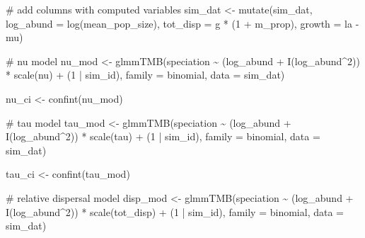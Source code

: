 \documentclass[
  letterpaper,
  DIV=11,
  numbers=noendperiod]{scrartcl}
\newenvironment{Shaded}{\begin{snugshade}}{\end{snugshade}}
\newcommand{\AttributeTok}[1]{\textcolor[rgb]{0.40,0.45,0.13}{#1}}
\newcommand{\CommentTok}[1]{\textcolor[rgb]{0.37,0.37,0.37}{#1}}
\newcommand{\DecValTok}[1]{\textcolor[rgb]{0.68,0.00,0.00}{#1}}
\newcommand{\FunctionTok}[1]{\textcolor[rgb]{0.28,0.35,0.67}{#1}}
\newcommand{\NormalTok}[1]{\textcolor[rgb]{0.00,0.23,0.31}{#1}}
\newcommand{\OtherTok}[1]{\textcolor[rgb]{0.00,0.23,0.31}{#1}}
\newcommand{\SpecialCharTok}[1]{\textcolor[rgb]{0.37,0.37,0.37}{#1}}
\begin{document}
\begin{Shaded}
\begin{Highlighting}[]
\CommentTok{\# add columns with computed variables}
\NormalTok{sim\_dat }\OtherTok{\textless{}{-}} \FunctionTok{mutate}\NormalTok{(sim\_dat, }
                  \AttributeTok{log\_abund =} \FunctionTok{log}\NormalTok{(mean\_pop\_size), }
                  \AttributeTok{tot\_disp =}\NormalTok{ g }\SpecialCharTok{*}\NormalTok{ (}\DecValTok{1} \SpecialCharTok{+}\NormalTok{ m\_prop), }
                  \AttributeTok{growth =}\NormalTok{ la }\SpecialCharTok{{-}}\NormalTok{ mu)}


\CommentTok{\# nu model}
\NormalTok{nu\_mod }\OtherTok{\textless{}{-}} \FunctionTok{glmmTMB}\NormalTok{(speciation }\SpecialCharTok{\textasciitilde{}} 
\NormalTok{                      (log\_abund }\SpecialCharTok{+} \FunctionTok{I}\NormalTok{(log\_abund}\SpecialCharTok{\^{}}\DecValTok{2}\NormalTok{)) }\SpecialCharTok{*}
                      \FunctionTok{scale}\NormalTok{(nu) }\SpecialCharTok{+}
\NormalTok{                      (}\DecValTok{1} \SpecialCharTok{|}\NormalTok{ sim\_id), }
                  \AttributeTok{family =}\NormalTok{ binomial, }\AttributeTok{data =}\NormalTok{ sim\_dat)}

\NormalTok{nu\_ci }\OtherTok{\textless{}{-}} \FunctionTok{confint}\NormalTok{(nu\_mod)}


\CommentTok{\# tau model}
\NormalTok{tau\_mod }\OtherTok{\textless{}{-}} \FunctionTok{glmmTMB}\NormalTok{(speciation }\SpecialCharTok{\textasciitilde{}} 
\NormalTok{                       (log\_abund }\SpecialCharTok{+} \FunctionTok{I}\NormalTok{(log\_abund}\SpecialCharTok{\^{}}\DecValTok{2}\NormalTok{)) }\SpecialCharTok{*}
                       \FunctionTok{scale}\NormalTok{(tau) }\SpecialCharTok{+}
\NormalTok{                       (}\DecValTok{1} \SpecialCharTok{|}\NormalTok{ sim\_id), }
                   \AttributeTok{family =}\NormalTok{ binomial, }\AttributeTok{data =}\NormalTok{ sim\_dat)}

\NormalTok{tau\_ci }\OtherTok{\textless{}{-}} \FunctionTok{confint}\NormalTok{(tau\_mod)}

\CommentTok{\# relative dispersal model}
\NormalTok{disp\_mod }\OtherTok{\textless{}{-}} \FunctionTok{glmmTMB}\NormalTok{(speciation }\SpecialCharTok{\textasciitilde{}} 
\NormalTok{                        (log\_abund }\SpecialCharTok{+} \FunctionTok{I}\NormalTok{(log\_abund}\SpecialCharTok{\^{}}\DecValTok{2}\NormalTok{)) }\SpecialCharTok{*}
                        \FunctionTok{scale}\NormalTok{(tot\_disp) }\SpecialCharTok{+} 
\NormalTok{                        (}\DecValTok{1} \SpecialCharTok{|}\NormalTok{ sim\_id), }
                    \AttributeTok{family =}\NormalTok{ binomial, }\AttributeTok{data =}\NormalTok{ sim\_dat)}


\end{Highlighting}
\end{Shaded}
\end{document}
